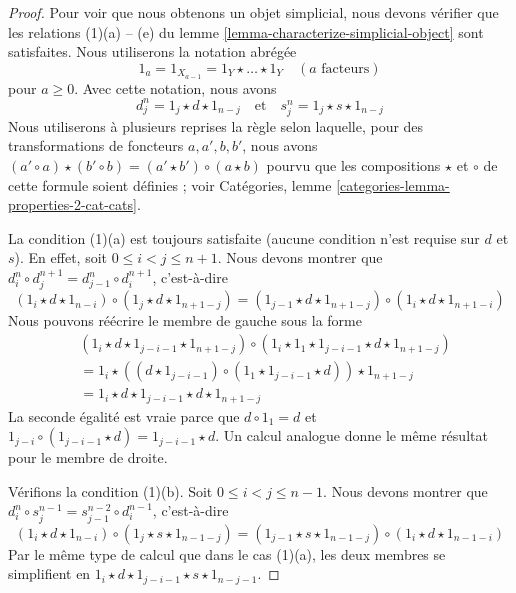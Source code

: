 \begin{proof}
Pour voir que nous obtenons un objet simplicial, nous devons vérifier que les
relations (1)(a) -- (e) du lemme \ref{lemma-characterize-simplicial-object}
sont satisfaites. Nous utiliserons la notation abrégée
$$
1_a = 1_{X_{a - 1}} = 1_Y \star \ldots \star 1_Y \quad (a\text{ facteurs})
$$
pour $a \geq 0$. Avec cette notation, nous avons
$$
d^n_j = 1_j \star d \star 1_{n - j}
\quad\text{et}\quad
s^n_j = 1_j \star s \star 1_{n - j}
$$
Nous utiliserons à plusieurs reprises la règle selon laquelle, pour des
transformations de foncteurs $a, a', b, b'$, nous avons
$(a' \circ a) \star (b' \circ b) = (a' \star b') \circ (a \star b)$
pourvu que les compositions $\star$ et $\circ$ de cette formule soient
définies ; voir
Catégories, lemme \ref{categories-lemma-properties-2-cat-cats}.

\medskip\noindent
La condition (1)(a) est toujours satisfaite (aucune condition n'est requise
sur $d$ et $s$). En effet, soit $0 \leq i < j \leq n + 1$. Nous devons
montrer que $d^n_i \circ d^{n + 1}_j = d^n_{j - 1} \circ d^{n + 1}_i$,
c'est-à-dire
$$
(1_i \star d \star 1_{n - i}) \circ
(1_j \star d \star 1_{n + 1 - j}) =
(1_{j - 1} \star d \star 1_{n + 1 - j}) \circ
(1_i \star d \star 1_{n + 1 - i})
$$
Nous pouvons réécrire le membre de gauche sous la forme
\begin{align*}
& (1_i \star d \star 1_{j - i - 1} \star 1_{n + 1 - j}) \circ
(1_i \star 1_1 \star 1_{j - i - 1} \star d \star 1_{n + 1 - j}) \\
& =
1_i \star
\left((d \star 1_{j - i - 1}) \circ
(1_1 \star 1_{j - i - 1} \star d)\right) \star 1_{n + 1 - j} \\
& =
1_i \star d \star 1_{j - i - 1} \star d \star 1_{n + 1 - j} 
\end{align*}
La seconde égalité est vraie parce que $d \circ 1_1 = d$ et
$1_{j - i} \circ (1_{j - i - 1} \star d) = 1_{j - i - 1} \star d$.
Un calcul analogue donne le même résultat pour le membre de droite.

\medskip\noindent
Vérifions la condition (1)(b). Soit $0 \leq i < j \leq n - 1$. Nous devons
montrer que $d^n_i \circ s^{n - 1}_j = s^{n - 2}_{j - 1} \circ d^{n - 1}_i$,
c'est-à-dire
$$
(1_i \star d \star 1_{n - i}) \circ
(1_j \star s \star 1_{n - 1 - j}) =
(1_{j - 1} \star s \star 1_{n - 1 - j}) \circ
(1_i \star d \star 1_{n - 1 - i})
$$
Par le même type de calcul que dans le cas (1)(a), les deux membres se
simplifient en $1_i \star d \star 1_{j - i - 1} \star s \star 1_{n - j - 1}$.


\end{proof}
